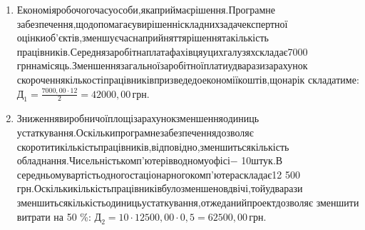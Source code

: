 \begin{enumerate}
	\item Економія\hfill робочого\hfill часу\hfill особи,\hfill яка\hfill приймає\hfill рішення.\hfill Програмне\newline \hspace*{-20mm} забезпечення,\hfill що\hfill допомагає\hfill у\hfill вирішенні\hfill складних\hfill задач\hfill експертної\newline \hspace*{-20mm} оцінки\hfill об’єктів,\hfill зменшує\hfill час\hfill на\hfill прийняття\hfill рішення\hfill та\hfill кількість\newline \hspace*{-20mm} працівників.\hfill Середня\hfill заробітна\hfill плата\hfill фахівця\hfill у\hfill цих\hfill галузях\hfill складає\hfill 7000\newline \hspace*{-20mm} грн\hfill на\hfill місяць.\hfill Зменшення\hfill загальної\hfill заробітної\hfill плати\hfill у\hfill два\hfill рази\hfill за\hfill рахунок\newline \hspace*{-20mm} скорочення\hfill кількості\hfill працівників\hfill призведе\hfill до\hfill економії\hfill коштів,\hfill що\hfill на\hfill рік\newline \hspace*{-20mm} складатиме: $\text{Д}_{1} = \frac{7000,00 \cdot 12}{2} = 42000,00 \, \text{грн}$.
	\item Зниження\hfill виробничої\hfill площі\hfill за\hfill рахунок\hfill зменшення\hfill одиниць\newline \hspace*{-20mm} устаткування.\hfill Оскільки\hfill програмне\hfill забезпечення\hfill дозволяє\newline \hspace*{-20mm} скоротити\hfill кількість\hfill працівників,\hfill відповідно,\hfill зменшиться\hfill кількість\newline \hspace*{-20mm} обладнання.\hfill Чисельність\hfill комп’ютерів\hfill в\hfill одному\hfill офісі\hfill $-$ 10\hfill штук.\hfill В\newline \hspace*{-20mm} середньому\hfill вартість\hfill одного\hfill стаціонарного\hfill комп’ютера\hfill складає\hfill 12 500\newline \hspace*{-20mm} грн.\hfill Оскільки\hfill кількість\hfill працівників\hfill було\hfill зменшено\hfill вдвічі,\hfill то\hfill й\hfill у\hfill два\hfill рази\newline \hspace*{-20mm} зменшиться\hfill кількість\hfill одиниць\hfill устаткування,\hfill отже\hfill даний\hfill проект\hfill дозволяє\newline \hspace*{-20mm} зменшити витрати на 50 \%: $\text{Д}_{2} = 10 \cdot 12500,00 \cdot 0,5 = 62500,00 \, \text{грн}$.
\end{enumerate}

